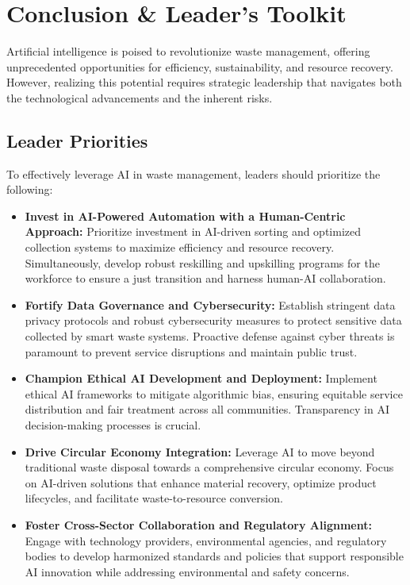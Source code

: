 \section{Conclusion \& Leader's Toolkit}

Artificial intelligence is poised to revolutionize waste management, offering unprecedented opportunities for efficiency, sustainability, and resource recovery. However, realizing this potential requires strategic leadership that navigates both the technological advancements and the inherent risks.

\subsection{Leader Priorities}

To effectively leverage AI in waste management, leaders should prioritize the following:
\begin{itemize}
    \item \textbf{Invest in AI-Powered Automation with a Human-Centric Approach:}
Prioritize investment in AI-driven sorting and optimized collection systems to maximize efficiency and resource recovery. Simultaneously, develop robust reskilling and upskilling programs for the workforce to ensure a just transition and harness human-AI collaboration.
    \item \textbf{Fortify Data Governance and Cybersecurity:}
Establish stringent data privacy protocols and robust cybersecurity measures to protect sensitive data collected by smart waste systems. Proactive defense against cyber threats is paramount to prevent service disruptions and maintain public trust.
    \item \textbf{Champion Ethical AI Development and Deployment:}
Implement ethical AI frameworks to mitigate algorithmic bias, ensuring equitable service distribution and fair treatment across all communities. Transparency in AI decision-making processes is crucial.
    \item \textbf{Drive Circular Economy Integration:}
Leverage AI to move beyond traditional waste disposal towards a comprehensive circular economy. Focus on AI-driven solutions that enhance material recovery, optimize product lifecycles, and facilitate waste-to-resource conversion.
    \item \textbf{Foster Cross-Sector Collaboration and Regulatory Alignment:}
Engage with technology providers, environmental agencies, and regulatory bodies to develop harmonized standards and policies that support responsible AI innovation while addressing environmental and safety concerns.
\end{itemize}

